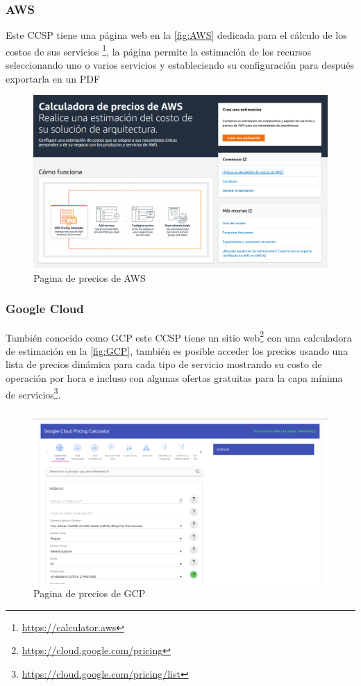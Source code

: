 \subsubsection{\acrlong{AWS}}
Este \acrshort{CCSP} tiene una página web en la \autoref{fig:AWS} dedicada para el cálculo de los costos de sus servicios \footnote{\url{https://calculator.aws}}, la página permite la estimación de los recursos seleccionando uno o varios servicios y estableciendo su configuración para después exportarla en un \acrfull{PDF}
\begin{figure}[h]
    \centering
    \includegraphics[width=\textwidth]{gfx/calculatorAws.png}
    \caption{Pagina de precios de \acrshort{AWS}}
    \label{fig:AWS}
\end{figure}

\subsubsection{Google Cloud}
También conocido como \acrfull{GCP} este \acrshort{CCSP} tiene un sitio web\footnote{\url{https://cloud.google.com/pricing}} con una calculadora de estimación en la \autoref{fig:GCP}, también es posible acceder los precios usando una lista de precios dinámica para cada tipo de servicio mostrando su costo de operación por hora e incluso con algunas ofertas gratuitas para la capa mínima de servicios\footnote{\url{https://cloud.google.com/pricing/list}}.
\begin{figure}[h]
    \centering
    \includegraphics[width=\textwidth]{gfx/calculatorGCP.png}
    \caption{Pagina de precios de \acrshort{GCP}}
    \label{fig:GCP}
\end{figure}

